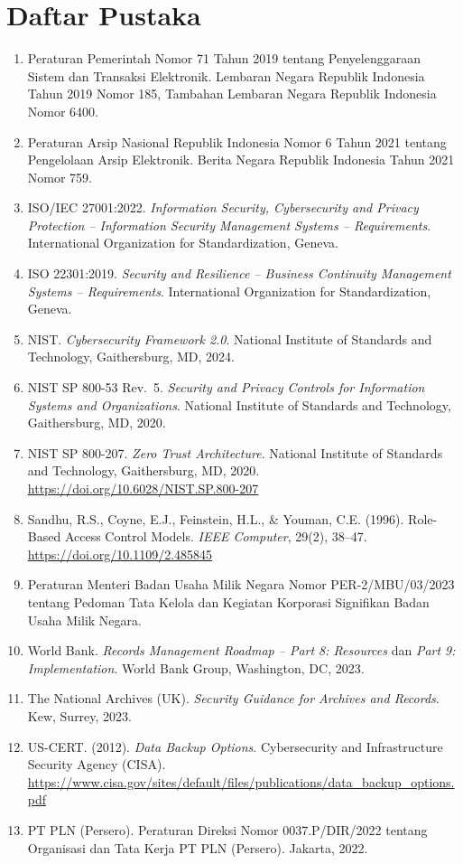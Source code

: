 \documentclass[12pt,a4paper]{report}
\begin{document}
\section*{Daftar Pustaka}
\begin{enumerate}[leftmargin=*, nosep]
    \item Peraturan Pemerintah Nomor 71 Tahun 2019 tentang Penyelenggaraan Sistem dan Transaksi Elektronik. Lembaran Negara Republik Indonesia Tahun 2019 Nomor 185, Tambahan Lembaran Negara Republik Indonesia Nomor 6400.
    \item Peraturan Arsip Nasional Republik Indonesia Nomor 6 Tahun 2021 tentang Pengelolaan Arsip Elektronik. Berita Negara Republik Indonesia Tahun 2021 Nomor 759.
    \item ISO/IEC 27001:2022. \textit{Information Security, Cybersecurity and Privacy Protection -- Information Security Management Systems -- Requirements}. International Organization for Standardization, Geneva.
    \item ISO 22301:2019. \textit{Security and Resilience -- Business Continuity Management Systems -- Requirements}. International Organization for Standardization, Geneva.
    \item NIST. \textit{Cybersecurity Framework 2.0}. National Institute of Standards and Technology, Gaithersburg, MD, 2024.
    \item NIST SP 800-53 Rev.~5. \textit{Security and Privacy Controls for Information Systems and Organizations}. National Institute of Standards and Technology, Gaithersburg, MD, 2020.
    \item NIST SP 800-207. \textit{Zero Trust Architecture}. National Institute of Standards and Technology, Gaithersburg, MD, 2020. \url{https://doi.org/10.6028/NIST.SP.800-207}
    \item Sandhu, R.S., Coyne, E.J., Feinstein, H.L., \& Youman, C.E. (1996). Role-Based Access Control Models. \textit{IEEE Computer}, 29(2), 38--47. \url{https://doi.org/10.1109/2.485845}
    \item Peraturan Menteri Badan Usaha Milik Negara Nomor PER-2/MBU/03/2023 tentang Pedoman Tata Kelola dan Kegiatan Korporasi Signifikan Badan Usaha Milik Negara.
    \item World Bank. \textit{Records Management Roadmap -- Part 8: Resources} dan \textit{Part 9: Implementation}. World Bank Group, Washington, DC, 2023.
    \item The National Archives (UK). \textit{Security Guidance for Archives and Records}. Kew, Surrey, 2023.
    \item US-CERT. (2012). \textit{Data Backup Options}. Cybersecurity and Infrastructure Security Agency (CISA). \url{https://www.cisa.gov/sites/default/files/publications/data_backup_options.pdf}
    \item PT PLN (Persero). Peraturan Direksi Nomor 0037.P/DIR/2022 tentang Organisasi dan Tata Kerja PT PLN (Persero). Jakarta, 2022.
\end{enumerate}
\end{document}
